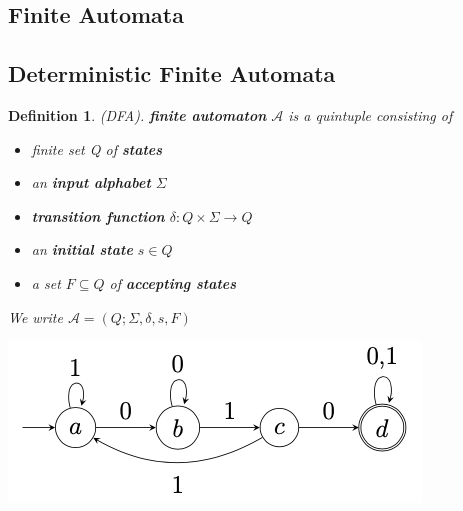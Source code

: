 \documentclass[a3paper, 8pt]{extarticle}
\newtheorem*{definition}{Definition}
\begin{document}
\begin{multicols*}{6}
    
    
    
\section{Finite Automata} 

\subsection{Deterministic Finite Automata} 

\begin{definition}
    (DFA). \textbf{finite automaton} $\mathcal{A}$ is a quintuple consisting of
    \begin{itemize}
        \item finite set Q of \textbf{states}
        \item an \textbf{input alphabet} $\Sigma$
        \item \textbf{transition function} $\delta: Q \times \Sigma \to Q$
        \item an \textbf{initial state} $s \in Q$
        \item a set $F \subseteq Q$ of \textbf{accepting states}
    \end{itemize}
    We write $\mathcal{A} = (Q;\Sigma, \delta, s, F)$
\end{definition}

\begin{center}
 \includegraphics[width=0.7\columnwidth]{images/Screen Shot 2022-11-24 at 12.45.09.png}   
\end{center}



\end{multicols*}
\end{document}
